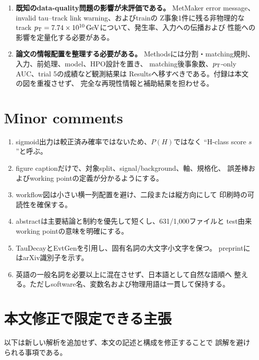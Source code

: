 \documentclass[xelatex,ja=standard,a4paper,10pt]{bxjsarticle}
\begin{document}
\begin{enumerate}
  \item \textbf{既知のdata-quality問題の影響が未評価である。}
    MetMaker error message、invalid tau--track link warning、およびtrainの
    Z事象1件に残る非物理的なtrack
    \(\pt=\SI{7.74e10}{\GeV}\)について、発生率、入力への伝播および
    性能への影響を定量化する必要がある。

  \item \textbf{論文の情報配置を整理する必要がある。}
    Methodsには分割・matching規則、入力、前処理、model、HPO設計を置き、
    matching後事象数、\(p_{\mathrm{T}}\)-only AUC、trial 5の成績など観測結果は
    Resultsへ移すべきである。付録は本文の図を重複させず、
    完全な再現性情報と補助結果を担わせる。
\end{enumerate}

\section{Minor comments}

\begin{enumerate}
  \item sigmoid出力は較正済み確率ではないため、\(P(H)\)ではなく
    ``H-class score \(s\)''と呼ぶ。
  \item figure captionだけで、対象split、signal/background、軸、規格化、
    誤差棒およびworking pointの定義が分かるようにする。
  \item workflow図は小さい横一列配置を避け、二段または縦方向にして
    印刷時の可読性を確保する。
  \item abstractは主要結論と制約を優先して短くし、631/1,000ファイルと
    test由来working pointの意味を明確にする。
  \item TauDecayとEvtGenを引用し、固有名詞の大文字小文字を保つ。
    preprintにはarXiv識別子を示す。
  \item 英語の一般名詞を必要以上に混在させず、日本語として自然な語順へ
    整える。ただしsoftware名、変数名および物理用語は一貫して保持する。
\end{enumerate}

\section{本文修正で限定できる主張}

以下は新しい解析を追加せず、本文の記述と構成を修正することで
誤解を避けられる事項である。
\end{document}

